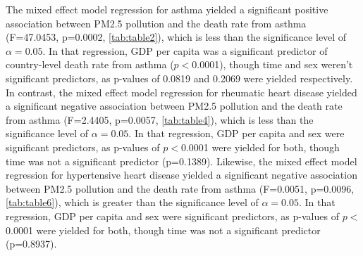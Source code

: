 \documentclass[12pt, letterpaper, twoside]{article}
\begin{document}
The mixed effect model regression for asthma yielded a significant
positive association between PM2.5 pollution and the death rate from asthma
(F=47.0453, p=0.0002, \autoref{tab:table2}), which is less
than the significance level of \begin{math}\alpha = 0.05\end{math}. In that
regression, GDP per capita was a significant predictor of country-level death rate
from asthma (\begin{math}p<\end{math}0.0001), though time and sex weren't
significant predictors, as p-values of 0.0819 and 0.2069 were yielded
respectively. In contrast, the mixed effect model regression for rheumatic heart
disease yielded a significant negative association between PM2.5 pollution and
the death rate from asthma (F=2.4405, p=0.0057, \autoref{tab:table4}), which is
less than the significance level of \begin{math}\alpha = 0.05\end{math}. In that
regression, GDP per capita and sex were significant predictors, as p-values of
\begin{math}p<\end{math}0.0001 were yielded for both, though time was not a
significant predictor (p=0.1389). Likewise, the mixed effect model regression for
hypertensive heart disease yielded a significant negative association between
PM2.5 pollution and the death rate from asthma (F=0.0051, p=0.0096,
\autoref{tab:table6}), which is greater than the significance level of
\begin{math}\alpha = 0.05\end{math}. In that regression, GDP per capita and sex
were significant predictors, as p-values of \begin{math}p<\end{math}0.0001 were
yielded for both, though time was not a significant predictor (p=0.8937).
\end{document}
